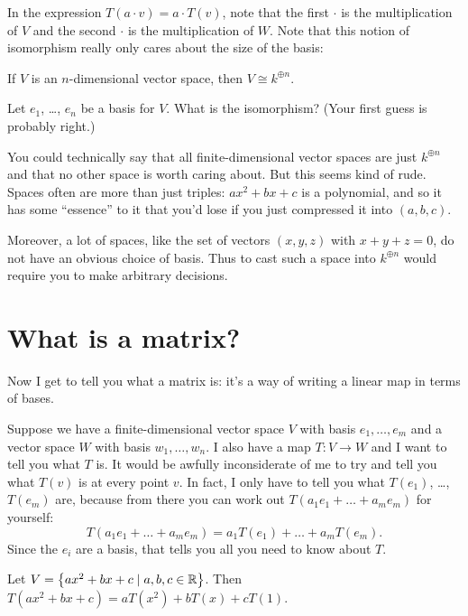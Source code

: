 In the expression $T(a \cdot v) = a \cdot T(v)$, note that the first $\cdot$ is the multiplication of $V$ and the second $\cdot$ is the multiplication of $W$.
Note that this notion of isomorphism really only cares about the size of the basis:
\begin{proposition}
	If $V$ is an $n$-dimensional vector space, then
	$V \cong k^{\oplus n}$.
\end{proposition}
\begin{ques}
	Let $e_1$, \dots, $e_n$ be a basis for $V$.
	What is the isomorphism?
	(Your first guess is probably right.)
\end{ques}
\begin{remark}
	You could technically say that all finite-dimensional vector
	spaces are just $k^{\oplus n}$ and that no other space is worth
	caring about.
	But this seems kind of rude.
	Spaces often are more than just triples: $ax^2+bx+c$ is a polynomial,
	and so it has some ``essence'' to it that you'd lose if you
	just compressed it into $(a,b,c)$.

	Moreover, a lot of spaces, like the set of vectors $(x,y,z)$ with $x+y+z=0$,
	do not have an obvious choice of basis.
	Thus to cast such a space into $k^{\oplus n}$
	would require you to make arbitrary decisions.
\label{rem:vector_spaces_have_essence}
\end{remark}

\section{What is a matrix?}
Now I get to tell you what a matrix is:
it's a way of writing a linear map in terms of bases.

Suppose we have a finite-dimensional
vector space $V$ with basis $e_1, \dots, e_m$
and a vector space $W$ with basis $w_1, \dots, w_n$.
I also have a map $T \colon V \to W$ and I want to tell you what $T$ is.
It would be awfully inconsiderate of me to try and tell you what $T(v)$
is at every point $v$.
In fact, I only have to tell you what $T(e_1)$, \dots, $T(e_m)$ are,
because from there you can work out
$T(a_1 e_1 + \dots + a_m e_m)$ for yourself:
\[ T(a_1 e_1 + \dots + a_m e_m) = a_1 T(e_1) + \dots + a_m T(e_m). \]
Since the $e_i$ are a basis, that tells you all you need to know about $T$.
\begin{example}
	Let $V = \left\{ ax^2+bx+c \mid a,b,c \in \mathbb R \right\}$.
	Then $T(ax^2+bx+c) = aT(x^2) + bT(x) + cT(1)$.
\end{example}

